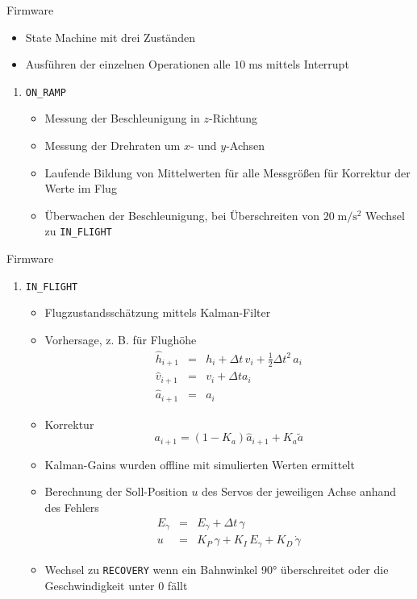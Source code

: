 \documentclass{beamer}
\renewcommand{\u}[1]{\;\mathrm{#1}}
\newcounter{saveenumi}
\newcommand{\seti}{\setcounter{saveenumi}{\value{enumi}}}
\newcommand{\conti}{\setcounter{enumi}{\value{saveenumi}}}
\begin{document}
\begin{frame}{Firmware}
\begin{itemize}
\item State Machine mit drei Zuständen
\item Ausführen der einzelnen Operationen alle $10\u{ms}$ mittels Interrupt
\end{itemize}
\begin{enumerate}
\item \texttt{ON\_RAMP}
\begin{itemize}
\item Messung der Beschleunigung in $z$-Richtung
\item Messung der Drehraten um $x$- und $y$-Achsen
\item Laufende Bildung von Mittelwerten für alle Messgrößen für Korrektur der Werte im Flug
\item Überwachen der Beschleunigung, bei Überschreiten von $20\u{m/s^2}$ Wechsel zu \texttt{IN\_FLIGHT}
\end{itemize}
\seti
\end{enumerate}
\end{frame}

\begin{frame}{Firmware}
\begin{enumerate}
\conti
\item \texttt{IN\_FLIGHT}
\begin{itemize}
\item Flugzustandsschätzung mittels Kalman-Filter
\item Vorhersage, z. B. für Flughöhe \begin{eqnarray}\hat{h}_{i+1} &=& h_i + \Delta t\,v_i + \tfrac{1}{2} \Delta t^2\, a_i \\
\hat{v}_{i+1} &=& v_i + \Delta t a_i \\
\hat{a}_{i+1} &=& a_i \end{eqnarray}
\item Korrektur \begin{equation}a_{i+1} = (1-K_a) \hat{a}_{i+1} + K_a \tilde{a}\end{equation}
\item Kalman-Gains wurden offline mit simulierten Werten ermittelt
\item Berechnung der Soll-Position $u$ des Servos der jeweiligen Achse anhand des Fehlers
\begin{eqnarray}E_{\gamma} &=& E_{\gamma} + \Delta t\,\gamma \\
u &=& K_P\,\gamma + K_I\,E_{\gamma} + K_D\,\dot{\gamma}\end{eqnarray}
\item Wechsel zu \texttt{RECOVERY} wenn ein Bahnwinkel 90° überschreitet oder die Geschwindigkeit unter 0 fällt
\end{itemize}
\seti
\end{enumerate}
\end{frame}
\end{document}
